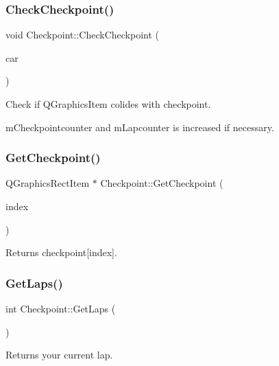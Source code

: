 \subsubsection{\texorpdfstring{CheckCheckpoint()}{CheckCheckpoint()}}
{\footnotesize\ttfamily void Checkpoint\+::\+Check\+Checkpoint (\begin{DoxyParamCaption}\item[{Q\+Graphics\+Item $\ast$}]{car }\end{DoxyParamCaption})}



Check if Q\+Graphics\+Item colides with checkpoint. 

m\+Checkpointcounter and m\+Lapcounter is increased if necessary. \mbox{\label{class_checkpoint_a7e0785010e4a35ce3825d22322dbd449}} 
\subsubsection{\texorpdfstring{GetCheckpoint()}{GetCheckpoint()}}
{\footnotesize\ttfamily Q\+Graphics\+Rect\+Item $\ast$ Checkpoint\+::\+Get\+Checkpoint (\begin{DoxyParamCaption}\item[{int}]{index }\end{DoxyParamCaption})}



Returns checkpoint\mbox{[}index\mbox{]}. 

\mbox{\label{class_checkpoint_acb598b1238d4760ba1fceca3744f3634}} 
\subsubsection{\texorpdfstring{GetLaps()}{GetLaps()}}
{\footnotesize\ttfamily int Checkpoint\+::\+Get\+Laps (\begin{DoxyParamCaption}{ }\end{DoxyParamCaption})}



Returns your current lap. 

\mbox{\label{class_checkpoint_a13fd023c0131da6fb54ae699fbd68049}} 
